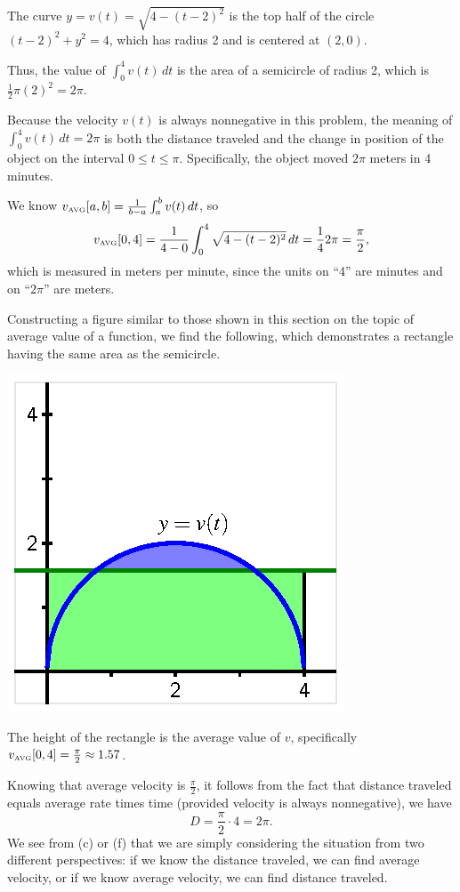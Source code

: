 \begin{activitySolution}
\ba
	\item The curve $y = v(t) = \sqrt{4-(t-2)^2}$ is the top half of the circle $(t-2)^2 + y^2 = 4$, which has radius 2 and is centered at $(2,0)$.
	\item Thus, the value of $\int_0^4 v(t) \, dt$ is the area of a semicircle of radius 2, which is $\frac{1}{2} \pi (2)^2 = 2\pi$.
	\item Because the velocity $v(t)$ is always nonnegative in this problem, the meaning of $\int_0^4 v(t) \, dt = 2\pi$ is both the distance traveled and the change in position of the object on the interval $0 \le t \le \pi$.  Specifically, the object moved $2 \pi$ meters in 4 minutes.
	\item We know $v_{\mbox{\tiny{AVG}}}[a,b] = \frac{1}{b-a}  \int_a^b v(t) \, dt$, so
	$$v_{\mbox{\tiny{AVG}}}[0,4] = \frac{1}{4-0}  \int_0^4 \sqrt{4-(t-2)^2} \, dt = \frac{1}{4} 2\pi = \frac{\pi}{2},$$
	which is measured in meters per minute, since the units on ``4'' are minutes and on ``$2\pi$'' are meters.
	\item Constructing a figure similar to those shown in this section on the topic of average value of a function, we find the following, which demonstrates a rectangle having the same area as the semicircle.
	\begin{center}
	  \includegraphics{figures/4_3_Act3Soln.eps}
	\end{center}
	The height of the rectangle is the average value of $v$, specifically $v_{\mbox{\tiny{AVG}}}[0,4] = \frac{\pi}{2} \approx 1.57$.
	\item Knowing that average velocity is $\frac{\pi}{2}$, it follows from the fact that distance traveled equals average rate times time (provided velocity is always nonnegative), we have
	$$D = \frac{\pi}{2} \cdot 4 = 2\pi.$$
	We see from (c) or (f) that we are simply considering the situation from two different perspectives: if we know the distance traveled, we can find average velocity, or if we know average velocity, we can find distance traveled.
\ea
\end{activitySolution}
\aftera





